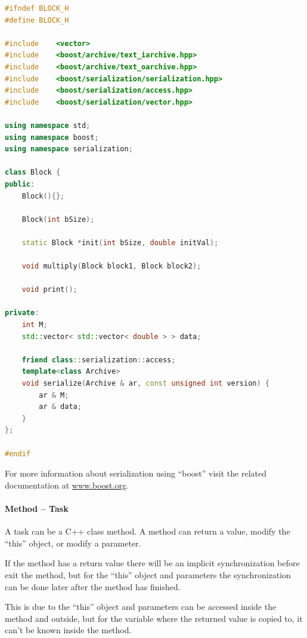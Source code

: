 \begin{lstlisting}[language=C++]
#ifndef BLOCK_H
#define BLOCK_H

#include    <vector>
#include    <boost/archive/text_iarchive.hpp>
#include    <boost/archive/text_oarchive.hpp>
#include    <boost/serialization/serialization.hpp>
#include    <boost/serialization/access.hpp>
#include    <boost/serialization/vector.hpp>

using namespace std;
using namespace boost;
using namespace serialization;

class Block {
public:
    Block(){};

    Block(int bSize);
       
    static Block *init(int bSize, double initVal);
        
    void multiply(Block block1, Block block2);
        
    void print();

private:
    int M;
    std::vector< std::vector< double > > data;
        
    friend class::serialization::access;
    template<class Archive>
    void serialize(Archive & ar, const unsigned int version) {
        ar & M;
        ar & data;
    }
};

#endif
\end{lstlisting}

For more information about serialization using ``boost'' visit the related documentation at \url{www.boost.org}.


\paragraph{Method – Task}

A task can be a C++ class method. A method can return a value, modify the “this” object, or modify a parameter.

If the method has a return value there will be an implicit synchronization before exit the method, but for the “this” object and parameters the synchronization can be done later after the method has finished.

This is due to the ``this'' object and parameters can be accessed inside the method and outside, but for the variable where the returned value is copied to, it can’t be known inside the method.

